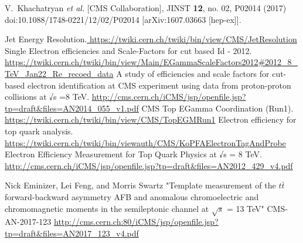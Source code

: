 \documentclass{cmspaperpdf}
\begin{document}
\begin{thebibliography}{9}
  V.~Khachatryan {\it et al.} [CMS Collaboration],
  JINST {\bf 12}, no. 02, P02014 (2017)
  doi:10.1088/1748-0221/12/02/P02014
  [arXiv:1607.03663 [hep-ex]].
  
 Jet Energy Resolution.\url{ https://twiki.cern.ch/twiki/bin/view/CMS/JetResolution}
 Single Electron efficiencies and Scale-Factors for cut based Id - 2012. \url{ https://twiki.cern.ch/twiki/bin/view/Main/EGammaScaleFactors2012#2012_8_TeV_Jan22_Re_recoed_data}
 A study of efficiencies and scale factors for cut-based electron identification at CMS experiment using data from proton-proton collisions at √s =8 TeV.
\url{http://cms.cern.ch/iCMS/jsp/openfile.jsp?tp=draft&files=AN2014_055_v1.pdf}
 CMS Top EGamma Coordination (Run1). \url{https://twiki.cern.ch/twiki/bin/view/CMS/TopEGMRun1}
 Electron efficiency for top quark analysis. \url{https://twiki.cern.ch/twiki/bin/viewauth/CMS/KoPFAElectronTagAndProbe}
 Electron Efficiency Measurement for Top Quark Physics at √s = 8 TeV. \url{ http://cms.cern.ch/iCMS/jsp/openfile.jsp?tp=draft&files=AN2012_429_v4.pdf}

Nick Eminizer, Lei Feng, and Morris Swartz
"Template measurement of the $t\bar t$ forward-backward asymmetry AFB and anomalous chromoelectric and chromomagnetic moments in the semileptonic channel at $\sqrt{s}$ = 13 TeV" 
CMS-AN-2017-123
\url{http://cms.cern.ch:80/iCMS/jsp/openfile.jsp?tp=draft&files=AN2017_123_v4.pdf}


\end{thebibliography}
\end{document}
